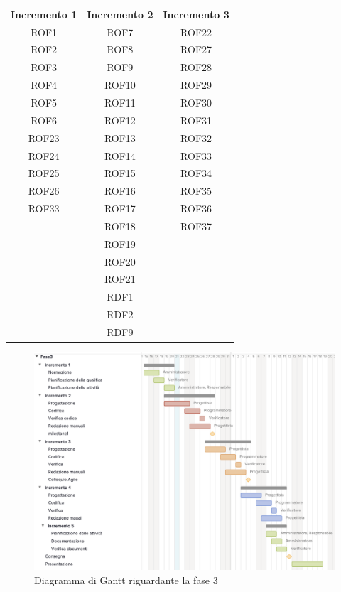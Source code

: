 \begin{tabularx}{\textwidth}{| c | c | c | }
		\rowcolor{LightBlue}
		\color{white}\bfseries Incremento 1 & 
		\color{white}\bfseries Incremento 2 & 
		\color{white}\bfseries Incremento 3 \\[0.25cm]
		ROF1 & ROF7 & ROF22 \\ 
		ROF2 & ROF8 & ROF27 \\ 
		ROF3 & ROF9 & ROF28 \\ 
		ROF4 & ROF10 & ROF29 \\ 
		ROF5 & ROF11 & ROF30 \\ 
		ROF6 & ROF12 & ROF31 \\ 
		ROF23 & ROF13 & ROF32 \\ 
		ROF24 & ROF14 & ROF33 \\ 
		ROF25 & ROF15 & ROF34 \\ 
		ROF26 & ROF16 & ROF35 \\ 
		ROF33 & ROF17 & ROF36 \\ 
		& ROF18 & ROF37 \\ 
		& ROF19 & \\ 
		& ROF20 & \\ 
		& ROF21 & \\ 
		& RDF1 & \\ 
		& RDF2 & \\ 
		& RDF9 & \\ \hline
	\end{tabularx}

\begin{figure}[h]
	\centering
	\includegraphics[scale=0.60]{images/fase3.png}
	\caption{Diagramma di Gantt riguardante la fase 3}
\end{figure}